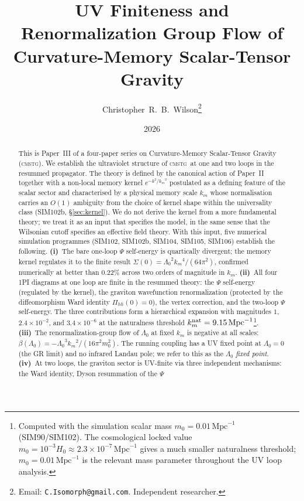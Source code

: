 \documentclass[12pt,a4paper]{article}
\title{\textbf{UV Finiteness and Renormalization Group Flow of\\
       Curvature-Memory Scalar-Tensor Gravity}}
\author{Christopher~R.~B.~Wilson\thanks{Email: \texttt{C.Isomorph@gmail.com}. Independent researcher.}}
\date{2026}
\newcommand{\CMSTG}{\textsc{cmstg}}
\newcommand{\Lz}{{\Lambda_0}}
\newcommand{\km}{{k_m}}
\newcommand{\knat}{{k_m^{\rm nat}}}
\begin{document}
\maketitle

\begin{abstract}
This is Paper~III of a four-paper series on Curvature-Memory Scalar-Tensor
Gravity (\CMSTG). We establish the ultraviolet structure of \CMSTG\ at one
and two loops in the resummed propagator. The theory
is defined by the canonical action of Paper~II~\cite{WilsonPaperII} together
with a non-local memory kernel $e^{-k^2/\km^2}$ postulated as a defining
feature of the scalar sector and characterised by a physical memory scale $\km$
whose normalisation carries an $O(1)$ ambiguity from the choice of kernel shape
within the universality class (SIM102b, \S\ref{sec:kernel}).
We do not derive the kernel from a more fundamental theory; we treat it as an
input that specifies the model, in the same sense that the Wilsonian cutoff
specifies an effective field theory. With this input, five numerical simulation
programmes (SIM102, SIM102b, SIM104, SIM105, SIM106) establish the following.
\textbf{(i)}~The bare one-loop $\Psi$ self-energy is quartically divergent;
the memory kernel regulates it to the finite result
$\Sigma(0) = \Lz^2\km^4/(64\pi^2)$, confirmed numerically at better than
$0.22\%$ across two orders of magnitude in $\km$.
\textbf{(ii)}~All four 1PI diagrams at one loop are finite in the resummed
theory: the $\Psi$ self-energy (regulated by the kernel), the graviton
wavefunction renormalization (protected by the diffeomorphism Ward identity
$\Pi_{hh}(0) = 0$), the vertex correction, and the two-loop $\Psi$ self-energy.
The three contributions form a hierarchical expansion with magnitudes $1$,
$2.4\times10^{-2}$, and $3.4\times10^{-6}$ at the naturalness threshold
$\knat = 9.15\,\mathrm{Mpc}^{-1}$\footnote{Computed with the simulation scalar
mass $m_0 = 0.01\,\mathrm{Mpc}^{-1}$ (SIM90/SIM102). The cosmological locked
value $m_0 = 10^{-3}H_0 \approx 2.3\times10^{-7}\,\mathrm{Mpc}^{-1}$ gives a
much smaller naturalness threshold; $m_0 = 0.01\,\mathrm{Mpc}^{-1}$ is the
relevant mass parameter throughout the UV loop analysis.}.
\textbf{(iii)}~The renormalization-group flow of $\Lz$ at fixed $\km$ is
negative at all scales: $\beta(\Lz) = -\Lz^3\km^2/(16\pi^2 m_0^2)$. The
running coupling has a UV fixed point at $\Lz = 0$ (the GR limit) and no
infrared Landau pole; we refer to this as the \emph{$\Lz$ fixed point}.
\textbf{(iv)}~At two loops, the graviton sector is UV-finite via three
independent mechanisms: the Ward identity, Dyson resummation of the $\Psi$

\end{abstract}
\end{document}

